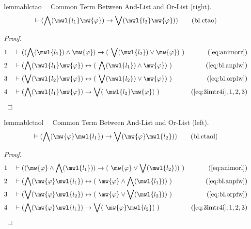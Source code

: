 \begin{restatable}{lemma}{blctao}~~ Common Term Between And-List and Or-List
(right).
\begin{align}
\vdash ( \bigwedge( \mwl{l_1} \mw{\varphi} ) \rightarrow \bigvee( \mwl{l_2}
    \mw{\varphi} ) )\label{eq:bl.ctao}\tag{bl.ctao}
\end{align}
\end{restatable}

\begin{proof}
\begin{align}
  1 &&  & \vdash ( ( \bigwedge( \mwl{l_1} ) \wedge \mw{\varphi} ) \rightarrow (
     ~\bigvee( \mwl{l_2} ) \vee \mw{\varphi} )
     ~)&(\mbox{\ref{eq:animorr}})\notag
  \\ 2 &&  & \vdash ( \bigwedge( \mwl{l_1} \mw{\varphi} ) \leftrightarrow (
     ~\bigwedge( \mwl{l_1} ) \wedge \mw{\varphi} )
     ~)&(\mbox{\ref{eq:bl.anplw}})\notag
  \\ 3 &&  & \vdash ( \bigvee( \mwl{l_2} \mw{\varphi} ) \leftrightarrow (
     ~\bigvee( \mwl{l_2} ) \vee \mw{\varphi} )
     ~)&(\mbox{\ref{eq:bl.orplw}})\notag
  \\ 4 &&  & \vdash ( \bigwedge( \mwl{l_1} \mw{\varphi} ) \rightarrow \bigvee(
     ~\mwl{l_2} \mw{\varphi} )
     ~)&(\mbox{\ref{eq:3imtr4i}},1,2,3)\notag
\end{align}
\end{proof}

\begin{restatable}{lemma}{blctaol}~~ Common Term Between And-List and Or-List
(left).
\begin{align}
\vdash ( \bigwedge( \mw{\varphi} \mwl{l_1} ) \rightarrow \bigvee( \mw{\varphi}
    \mwl{l_2} ) )\label{eq:bl.ctaol}\tag{bl.ctaol}
\end{align}
\end{restatable}

\begin{proof}
\begin{align}
  1 &&  & \vdash ( ( \mw{\varphi} \wedge \bigwedge( \mwl{l_1} ) ) \rightarrow (
     ~\mw{\varphi} \vee \bigvee( \mwl{l_2} ) )
     ~)&(\mbox{\ref{eq:animorl}})\notag
  \\ 2 &&  & \vdash ( \bigwedge( \mw{\varphi} \mwl{l_1} ) \leftrightarrow (
     ~\mw{\varphi} \wedge \bigwedge( \mwl{l_1} ) )
     ~)&(\mbox{\ref{eq:bl.anpfw}})\notag
  \\ 3 &&  & \vdash ( \bigvee( \mw{\varphi} \mwl{l_2} ) \leftrightarrow (
     ~\mw{\varphi} \vee \bigvee( \mwl{l_2} ) )
     ~)&(\mbox{\ref{eq:bl.orpfw}})\notag
  \\ 4 &&  & \vdash ( \bigwedge( \mw{\varphi} \mwl{l_1} ) \rightarrow \bigvee(
     ~\mw{\varphi} \mwl{l_2} )
     ~)&(\mbox{\ref{eq:3imtr4i}},1,2,3)\notag
\end{align}
\end{proof}

